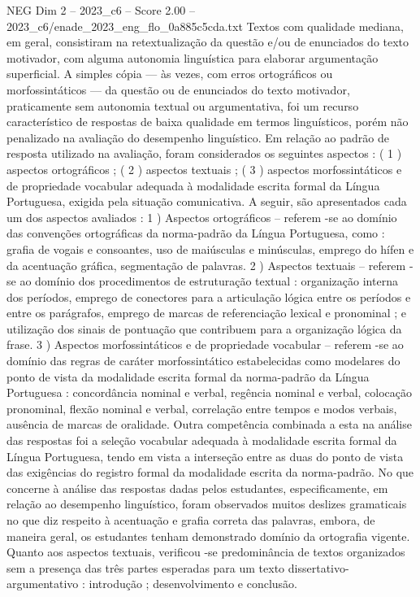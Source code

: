 \begin{textsample}{NEG Dim 2 – 2023\_c6 – Score 2.00 – 2023\_c6/enade\_2023\_eng\_flo\_0a885c5cda.txt}
Textos com qualidade mediana, em geral, consistiram na retextualização da questão e/ou de enunciados do texto motivador, com alguma autonomia linguística para elaborar argumentação superficial.
A simples cópia — às vezes, com erros ortográficos ou morfossintáticos — da questão ou de enunciados do texto motivador, praticamente sem autonomia textual ou argumentativa, foi um recurso característico de respostas de baixa qualidade em termos linguísticos, porém não penalizado na avaliação do desempenho linguístico.
Em relação ao padrão de resposta utilizado na avaliação, foram considerados os seguintes aspectos : ( 1 ) aspectos ortográficos ; ( 2 ) aspectos textuais ; ( 3 ) aspectos morfossintáticos e de propriedade vocabular adequada à modalidade escrita formal da Língua Portuguesa, exigida pela situação comunicativa.
A seguir, são apresentados cada um dos aspectos avaliados : 1 ) Aspectos ortográficos – referem -se ao domínio das convenções ortográficas da norma-padrão da Língua Portuguesa, como : grafia de vogais e consoantes, uso de maiúsculas e minúsculas, emprego do hífen e da acentuação gráfica, segmentação de palavras. 2 ) Aspectos textuais – referem -se ao domínio dos procedimentos de estruturação textual : organização interna dos períodos, emprego de conectores para a articulação lógica entre os períodos e entre os parágrafos, emprego de marcas de referenciação lexical e pronominal ; e utilização dos sinais de pontuação que contribuem para a organização lógica da frase. 3 ) Aspectos morfossintáticos e de propriedade vocabular – referem -se ao domínio das regras de caráter morfossintático estabelecidas como modelares do ponto de vista da modalidade escrita formal da norma-padrão da Língua Portuguesa : concordância nominal e verbal, regência nominal e verbal, colocação pronominal, flexão nominal e verbal, correlação entre tempos e modos verbais, ausência de marcas de oralidade.
Outra competência combinada a esta na análise das respostas foi a seleção vocabular adequada à modalidade escrita formal da Língua Portuguesa, tendo em vista a interseção entre as duas do ponto de vista das exigências do registro formal da modalidade escrita da norma-padrão.
No que concerne à análise das respostas dadas pelos estudantes, especificamente, em relação ao desempenho linguístico, foram observados muitos deslizes gramaticais no que diz respeito à acentuação e grafia correta das palavras, embora, de maneira geral, os estudantes tenham demonstrado domínio da ortografia vigente.
Quanto aos aspectos textuais, verificou -se predominância de textos organizados sem a presença das três partes esperadas para um texto dissertativo-argumentativo : introdução ; desenvolvimento e conclusão.

\end{textsample}

